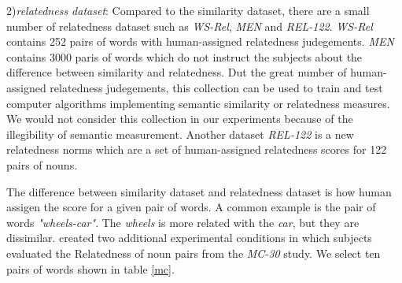 2)\emph{relatedness dataset}:
Compared to the similarity dataset, there are a small number of relatedness dataset such as
\emph{WS-Rel}, \emph{MEN} and \emph{REL-122}. \emph{WS-Rel} contains 252 pairs of words with
human-assigned relatedness judegements. \emph{MEN} contains 3000 paris of words which do not
instruct the subjects about the difference between similarity and relatedness. 
Dut the great number of human-assigned relatedness judegements, this collection can
be used to train and test computer algorithms implementing semantic similarity or relatedness measures.
We would not consider this collection in our experiments because of the illegibility of semantic measurement.
Another dataset \emph{REL-122} is a new relatedness norms which are a set of human-assigned relatedness scores
for 122 pairs of nouns.

The difference between similarity dataset and relatedness dataset is how human assigen the score for a
given pair of words. A common example is the pair of words \emph{"wheels-car"}. The \emph{wheels} is more related
with the \emph{car}, but they are dissimilar. \cite{acl/SzumlanskiGS13} created two additional experimental 
conditions in which subjects evaluated the Relatedness of noun pairs from the \emph{MC-30} study. We select 
ten pairs of words shown in table \ref{mc}. 
\begin{table}[]
    \centering
    \caption{Relatedness vs MC-30 similarity}
    \label{mc}
    \renewcommand\arraystretch{1.2}
\end{table}
